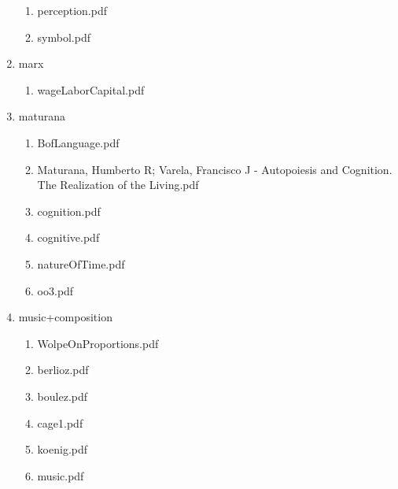 \documentclass[11pt]{article}
\begin{document}
\begin{enumerate}
\begin{enumerate}
\item perception.pdf
\label{sec-1-1-1-1-18-20-15}

\item symbol.pdf
\label{sec-1-1-1-1-18-20-16}
\end{enumerate}

\item marx
\label{sec-1-1-1-1-18-21}
\begin{enumerate}
\item wageLaborCapital.pdf
\label{sec-1-1-1-1-18-21-1}
\end{enumerate}

\item maturana
\label{sec-1-1-1-1-18-22}
\begin{enumerate}
\item BofLanguage.pdf
\label{sec-1-1-1-1-18-22-1}

\item Maturana, Humberto R; Varela, Francisco J - Autopoiesis and Cognition. The Realization of the Living.pdf
\label{sec-1-1-1-1-18-22-2}

\item cognition.pdf
\label{sec-1-1-1-1-18-22-3}

\item cognitive.pdf
\label{sec-1-1-1-1-18-22-4}

\item natureOfTime.pdf
\label{sec-1-1-1-1-18-22-5}

\item oo3.pdf
\label{sec-1-1-1-1-18-22-6}
\end{enumerate}

\item music+composition
\label{sec-1-1-1-1-18-23}
\begin{enumerate}
\item WolpeOnProportions.pdf
\label{sec-1-1-1-1-18-23-1}

\item berlioz.pdf
\label{sec-1-1-1-1-18-23-2}

\item boulez.pdf
\label{sec-1-1-1-1-18-23-3}

\item cage1.pdf
\label{sec-1-1-1-1-18-23-4}

\item koenig.pdf
\label{sec-1-1-1-1-18-23-5}

\item music.pdf
\label{sec-1-1-1-1-18-23-6}


\end{enumerate}
\end{enumerate}
\end{document}
